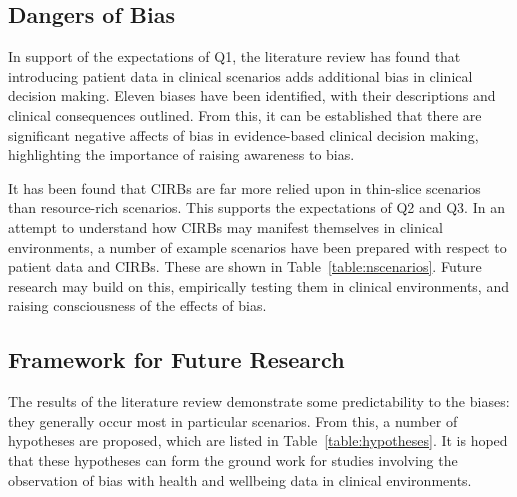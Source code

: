 \documentclass[a4paper]{scrartcl}     %
\begin{document}




  \subsection{Dangers of Bias}



    In support of the expectations of Q1, the literature review has found that introducing patient data in clinical scenarios adds additional bias in clinical decision making. Eleven biases have been identified, with their descriptions and clinical consequences outlined. From this, it can be established that there are significant negative affects of bias in evidence-based clinical decision making, highlighting the importance of raising awareness to bias.

    It has been found that CIRBs are far more relied upon in thin-slice scenarios than resource-rich scenarios. This supports the expectations of Q2 and Q3. In an attempt to understand how CIRBs may manifest themselves in clinical environments, a number of example scenarios have been prepared with respect to patient data and CIRBs. These are shown in Table~\ref{table:nscenarios}. Future research may build on this, empirically testing them in clinical environments, and raising consciousness of the effects of bias.

  \subsection{Framework for Future Research}


    The results of the literature review demonstrate some predictability to the biases: they generally occur most in particular scenarios. From this, a number of hypotheses are proposed, which are listed in Table~\ref{table:hypotheses}. It is hoped that these hypotheses can form the ground work for studies involving the observation of bias with health and wellbeing data in clinical environments.
\end{document}
